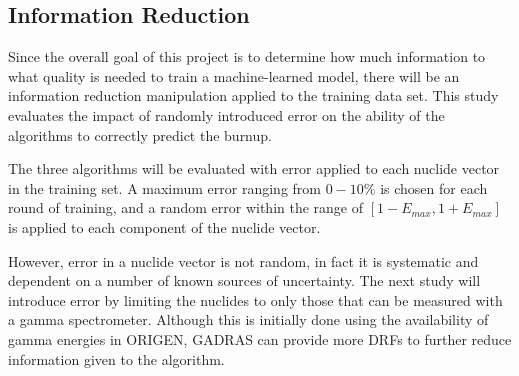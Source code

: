 \subsection{Information Reduction}
\label{sec:inforeduc}

Since the overall goal of this project is to determine how much information to
what quality is needed to train a machine-learned model, there will be an
information reduction manipulation applied to the training data set. This study
evaluates the impact of randomly introduced error on the ability of the
algorithms to correctly predict the burnup. 

The three algorithms will be evaluated with error applied to each nuclide
vector in the training set.  A maximum error ranging from $0 - 10\%$ is chosen
for each round of training, and a random error within the range of $[1-E_{max},
1+E_{max}]$ is applied to each component of the nuclide vector.

However, error in a nuclide vector is not random, in fact it is systematic and
dependent on a number of known sources of uncertainty. The next study will
introduce error by limiting the nuclides to only those that can be measured
with a gamma spectrometer. Although this is initially done using the
availability of gamma energies in \gls{ORIGEN}, \gls{GADRAS} can provide more
\gls{DRF}s to further reduce information given to the algorithm.

